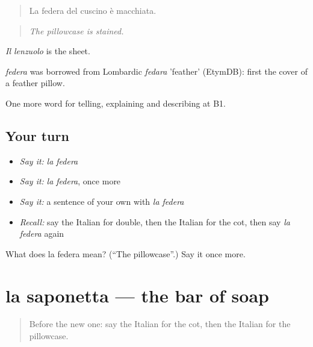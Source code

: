 \begin{quote}
La federa del cuscino è macchiata.
\end{quote}

\begin{quote}
\emph{The pillowcase is stained.}
\end{quote}

\emph{Il lenzuolo} is the sheet.

\begin{cousinweb}
\emph{federa} was borrowed from Lombardic \emph{fedara} 'feather' (EtymDB): first the cover of a feather pillow.
\end{cousinweb}

\begin{grammarlens}[title={What you've built}]
One more word for telling, explaining and describing at B1.
\end{grammarlens}

\subsection*{Your turn}
\begin{itemize}
\raggedright
  \item \emph{Say it:} \emph{la federa}
  \item \emph{Say it:} \emph{la federa}, once more
  \item \emph{Say it:} a sentence of your own with \emph{la federa}
  \item \emph{Recall:} say the Italian for double, then the Italian for the cot, then say \emph{la federa} again
\end{itemize}

\begin{tcolorbox}[breakable,colback=teal!4,colframe=teal!35!black,title={Before you move on}]
What does la federa mean? (\textquotedblleft{}The pillowcase\textquotedblright{}.) Say it once more.
\end{tcolorbox}
\section[la saponetta]{la saponetta — the bar of soap}

\label{lesson:IT-C433-saponetta}



\begin{quote}
Before the new one: say the Italian for the cot, then the Italian for the pillowcase.
\end{quote}

